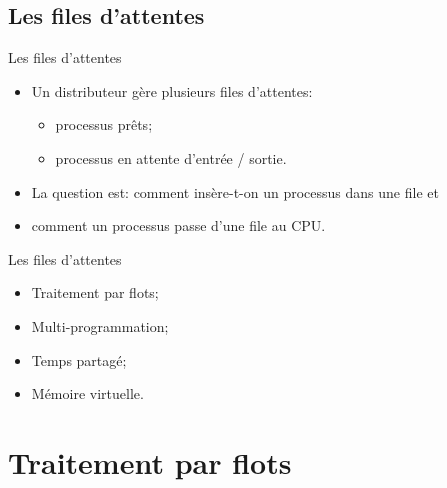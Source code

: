 \begin{frame}{\sectitle}
\section{\sectitle}

\def\subsectitle{Les files d'attentes}
\subsection{\subsectitle}

\begin{block}{\subsectitle}
\begin{itemize}
    \item Un distributeur gère plusieurs files d'attentes: 
    \begin{itemize}
        \item processus prêts;
        \item processus en attente d'entrée / sortie.
    \end{itemize}
    \item La question est: comment insère-t-on un processus dans une file et
    \item comment un processus passe d'une file au CPU.
\end{itemize}
\end{block}

\begin{exampleblock}{\subsectitle}
\begin{itemize}
    \item Traitement par flots;
    \item Multi-programmation;
    \item Temps partagé;
    \item Mémoire virtuelle.
\end{itemize}
\end{exampleblock}

\end{frame}

\def\sectitle{Traitement par flots}
\section{\sectitle}

